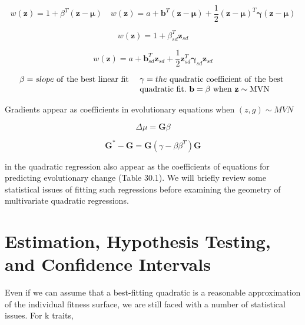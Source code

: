 \documentclass{article}
\begin{document}
\begin{equation}
w(\mathbf{z})=1+\beta^{T}(\mathbf{z}-\boldsymbol{\mu})\quad w(\mathbf{z})=a+\mathbf{b}^{T}(\mathbf{z}-\boldsymbol{\mu})+\frac{1}{2}(\mathbf{z}-\boldsymbol{\mu})^{T}\boldsymbol{\gamma}(\mathbf{z}-\boldsymbol{\mu})
\end{equation}

\begin{equation}
w(\mathbf{z})=1+\beta_{s d}^{T}\mathbf{z}_{s d}
\end{equation}

\begin{equation}
w(\mathbf{z})=a+\mathbf{b}_{s d}^{T}\mathbf{z}_{s d}+\frac{1}{2}\mathbf{z}_{s d}^{T}\boldsymbol{\gamma}_{s d}\mathbf{z}_{s d}
\end{equation}

\begin{equation}
\begin{array}{r l}{\beta=s l o p e\mathrm{~o f~t h e~b e s t~l i n e a r~f i t~}}&{{}\gamma=t h e\mathrm{~q u a d r a t i c~c o e f f i c i e n t~o f~t h e~b e s t~}}\\ {}&{{}\mathrm{q u a d r a t i c~f i t.~}\mathbf{b}=\beta\mathrm{~w h e n~}\mathbf{z}\sim\mathrm{M V N}}\\ \end{array}
\end{equation}

Gradients appear as coefficients in evolutionary equations when  $ (z, g) \sim MVN $

\begin{equation}
\Delta\mu=\mathbf{G}\beta
\end{equation}

\begin{equation}
\mathbf{G}^{*}-\mathbf{G}=\mathbf{G}\left(\gamma-\beta\beta^{T}\right)\mathbf{G}
\end{equation}

in the quadratic regression also appear as the coefficients of equations for predicting evolutionary change (Table 30.1). We will briefly review some statistical issues of fitting such regressions before examining the geometry of multivariate quadratic regressions.

\section{Estimation, Hypothesis Testing, and Confidence Intervals}
Even if we can assume that a best-fitting quadratic is a reasonable approximation of the individual fitness surface, we are still faced with a number of statistical issues. For k traits,
\end{document}
